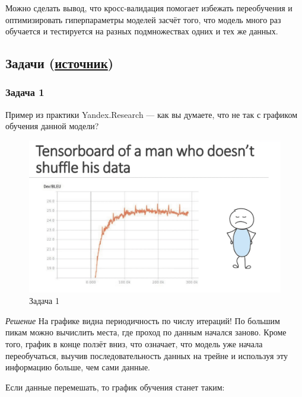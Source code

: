 Можно сделать вывод, что кросс-валидация помогает избежать переобучения и оптимизировать гиперпараметры моделей засчёт того, что модель много раз обучается и тестируется на разных подмножествах одних и тех же данных.

\subsection{Задачи (\href{https://education.yandex.ru/handbook/ml/article/kross-validaciya}{источник})}

\subsubsection{Задача 1}
Пример из практики Yandex.Research — как вы думаете, что не так с графиком обучения данной модели?

\begin{figure}[h]
    \centering
    \includegraphics[width=\textwidth/2]{chapters/general/problem-1.png}
    \caption{Задача 1}
    \label{img:problem-1}
\end{figure}

\textit{Решение}
На графике видна периодичность по числу итераций! По большим пикам можно вычислить места, где проход по данным начался заново. Кроме того, график в конце ползёт вниз, что означает, что модель уже начала переобучаться, выучив последовательность данных на трейне и используя эту информацию больше, чем сами данные.

Если данные перемешать, то график обучения станет таким:

